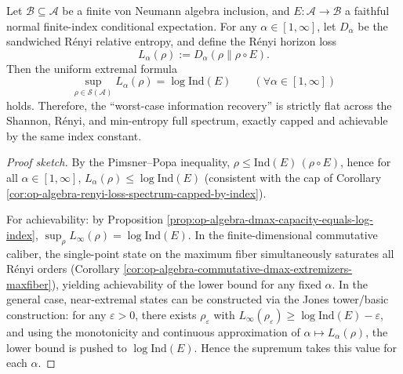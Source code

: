 \begin{corollary}\label{cor:op-algebra-renyi-flatness-sup-equals-log-index}
Let \(\mathcal{B}\subseteq\mathcal{A}\) be a finite von Neumann algebra inclusion, and \(E:\mathcal{A}\to\mathcal{B}\) a faithful normal finite-index conditional expectation.
For any \(\alpha\in[1,\infty]\), let \(D_\alpha\) be the sandwiched R\'enyi relative entropy, and define the R\'enyi horizon loss
\[
L_\alpha(\rho):=D_\alpha(\rho\|\rho\!\circ\!E).
\]
Then the uniform extremal formula
\[
\boxed{\;
\sup_{\rho\in\mathcal{S}(\mathcal{A})}L_\alpha(\rho)=\log\mathrm{Ind}(E)\qquad(\forall \alpha\in[1,\infty])\;}
\]
holds.
Therefore, the ``worst-case information recovery'' is strictly flat across the Shannon, R\'enyi, and min-entropy full spectrum, exactly capped and achievable by the same index constant.
\end{corollary}
\begin{proof}[Proof sketch]
By the Pimsner--Popa inequality, \(\rho\le \mathrm{Ind}(E)\,(\rho\!\circ\!E)\), hence for all \(\alpha\in[1,\infty]\),
\(
L_\alpha(\rho)\le \log\mathrm{Ind}(E)
\)
(consistent with the cap of Corollary \ref{cor:op-algebra-renyi-loss-spectrum-capped-by-index}).
\par
For achievability: by Proposition \ref{prop:op-algebra-dmax-capacity-equals-log-index}, \(\sup_\rho L_\infty(\rho)=\log\mathrm{Ind}(E)\).
In the finite-dimensional commutative caliber, the single-point state on the maximum fiber simultaneously saturates all R\'enyi orders (Corollary \ref{cor:op-algebra-commutative-dmax-extremizers-maxfiber}), yielding achievability of the lower bound for any fixed \(\alpha\).
In the general case, near-extremal states can be constructed via the Jones tower/basic construction: for any \(\varepsilon>0\), there exists \(\rho_\varepsilon\) with \(L_\infty(\rho_\varepsilon)\ge \log\mathrm{Ind}(E)-\varepsilon\), and using the monotonicity and continuous approximation of \(\alpha\mapsto L_\alpha(\rho)\), the lower bound is pushed to \(\log\mathrm{Ind}(E)\).
Hence the supremum takes this value for each \(\alpha\). \qedhere
\end{proof}

